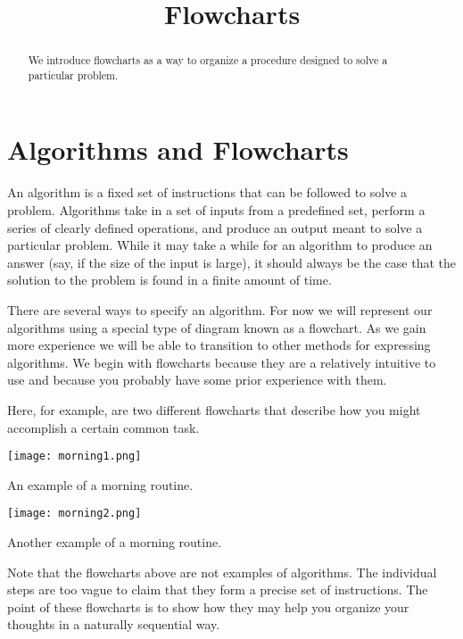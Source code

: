 \documentclass{ximera}
\title{Flowcharts}
\begin{document}
  
\begin{abstract}  
We introduce flowcharts as a way to organize a procedure designed to solve a particular problem.
\end{abstract}  
\maketitle

\section{Algorithms and Flowcharts}
An algorithm is a fixed set of instructions that can be followed to solve a problem. Algorithms take in a set of inputs from a predefined set, perform a series of clearly defined operations, and produce an output meant to solve a particular problem. While it may take a while for an algorithm to produce an answer (say, if the size of the input is large), it should always be the case that the solution to the problem is found in a finite amount of time.

There are several ways to specify an algorithm. For now we will represent our algorithms using a special type of diagram known as a flowchart. As we gain more experience we will be able to transition to other methods for expressing algorithms. We begin with flowcharts because they are a relatively intuitive to use and because you probably have some prior experience with them.

Here, for example, are two different flowcharts that describe how you might accomplish a certain common task. 

\begin{center}
	\texttt{[image: morning1.png]}
\end{center}
\begin{center}
	An example of a morning routine.
\end{center}

\begin{center}
	\texttt{[image: morning2.png]}
\end{center}
\begin{center}
	Another example of a morning routine.
\end{center}

Note that the flowcharts above are not examples of algorithms. The individual steps are too vague to claim that they form a precise set of instructions. The point of these flowcharts is to show how they may help you organize your thoughts in a naturally sequential way.
\end{document}
